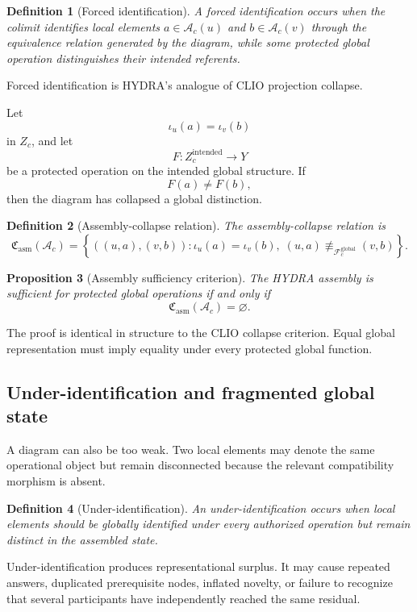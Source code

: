 \documentclass[11pt]{article}
\newtheorem{definition}{Definition}[section]
\newtheorem{proposition}[definition]{Proposition}
\theoremstyle{definition}
\newcommand{\F}{\mathcal{F}}
\newcommand{\A}{\mathcal{A}}
\begin{document}
\begin{definition}[Forced identification]
A forced identification occurs when the colimit identifies local elements \(a\in\A_c(u)\) and \(b\in\A_c(v)\) through the equivalence relation generated by the diagram, while some protected global operation distinguishes their intended referents.
\end{definition}

Forced identification is HYDRA's analogue of CLIO projection collapse.

Let
\[
\iota_u(a)=\iota_v(b)
\]
in \(Z_c\), and let
\[
F:Z_c^{\mathrm{intended}}\to Y
\]
be a protected operation on the intended global structure. If
\[
F(a)\neq F(b),
\]
then the diagram has collapsed a global distinction.

\begin{definition}[Assembly-collapse relation]
The assembly-collapse relation is
\[
\mathfrak C_{\mathrm{asm}}(\A_c)
=
\left\{
((u,a),(v,b)):
\iota_u(a)=\iota_v(b),
\;
(u,a)\not\equiv_{\F_c^{\mathrm{global}}}(v,b)
\right\}.
\]
\end{definition}

\begin{proposition}[Assembly sufficiency criterion]
The HYDRA assembly is sufficient for protected global operations if and only if
\[
\mathfrak C_{\mathrm{asm}}(\A_c)=\varnothing.
\]
\end{proposition}

The proof is identical in structure to the CLIO collapse criterion. Equal global representation must imply equality under every protected global function.

\subsection{Under-identification and fragmented global state}

A diagram can also be too weak. Two local elements may denote the same operational object but remain disconnected because the relevant compatibility morphism is absent.

\begin{definition}[Under-identification]
An under-identification occurs when local elements should be globally identified under every authorized operation but remain distinct in the assembled state.
\end{definition}

Under-identification produces representational surplus. It may cause repeated answers, duplicated prerequisite nodes, inflated novelty, or failure to recognize that several participants have independently reached the same residual.
\end{document}
